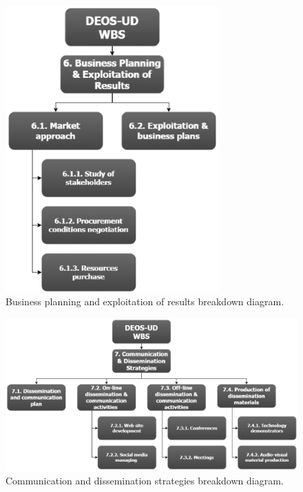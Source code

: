 \begin{figure}[H]
	\centering
	\includegraphics[height=11cm,keepaspectratio]{./sections/2.WBS/WBS_Section6}
	\caption[Business planning and exploitation of results breakdown diagram]{Business planning and exploitation of results breakdown diagram.}
	\label{fig:WBS_Section6}
\end{figure}

\begin{figure}[H]
	\centering
	\includegraphics[width=\textwidth]{./sections/2.WBS/WBS_Section7}
	\caption[Communication and dissemination strategies breakdown diagram]{Communication and dissemination strategies breakdown diagram.}
	\label{fig:WBS_Section7}
\end{figure}


